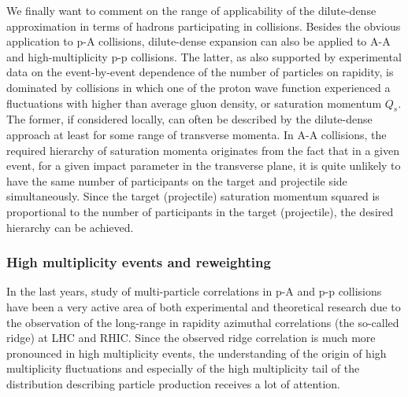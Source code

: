 We finally want to comment on the range of applicability  of the 
dilute-dense approximation in terms of hadrons participating in collisions. 
Besides the obvious application to p-A collisions, dilute-dense expansion 
can also be applied to A-A  and high-multiplicity p-p collisions. 
The latter, as also supported by experimental data on 
the event-by-event dependence of the number of particles on rapidity,   
is dominated by collisions in which one of the proton wave function experienced 
a fluctuations with higher than average gluon density, or saturation momentum $Q_s$. 
The former, if considered locally, can often be described by the 
dilute-dense approach at least for some range of transverse momenta. 
In A-A collisions, the required hierarchy of saturation momenta originates from 
the fact that in a given event, for a given impact parameter in the transverse plane, it is quite unlikely
to have the same number of participants on the target and projectile side simultaneously. 
Since the target (projectile) saturation momentum squared is proportional to the number 
of participants in the target (projectile), the desired hierarchy can be achieved.   




\subsubsection*{High multiplicity events and reweighting}
In the last years, study of multi-particle correlations in 
p-A and p-p collisions have been a very active 
area of both experimental and theoretical research 
due to the observation of the long-range in rapidity 
azimuthal correlations (the so-called ridge)
at LHC and RHIC.   
Since the observed ridge correlation is much more pronounced in high multiplicity
events, the understanding of the origin of high multiplicity
fluctuations and especially of the high multiplicity tail of the distribution describing 
particle production  
receives a lot of attention. 

